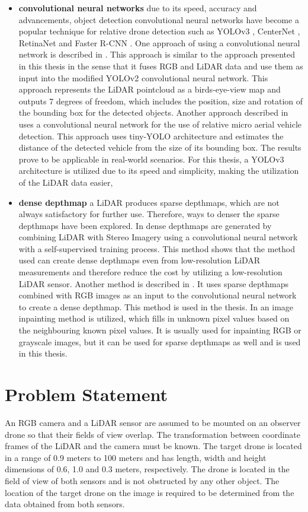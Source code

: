 \documentclass[twoside]{ctuthesis}
\theoremstyle{plain}
\theoremstyle{definition}
\theoremstyle{note}
\begin{document}
\begin{itemize}
	\item \textbf{convolutional neural networks} due to its speed, accuracy and advancements, object detection convolutional neural networks have become a popular technique for relative drone detection such as YOLOv3 \cite{redmon2018yolov3}, CenterNet \cite{zhou2019objects}, RetinaNet \cite{lin2018focal} and Faster R-CNN \cite{ren2016faster}. One approach of using a convolutional neural network is described in \cite{ali2018yolo3d}. This approach is similar to the approach presented in this thesis in the sense that it fuses RGB and LiDAR data and use them as input into the modified YOLOv2 \cite{redmon2016yolo9000} convolutional neural network. This approach represents the LiDAR pointcloud as a birds-eye-view map and outputs 7 degrees of freedom, which includes the position, size and rotation of the bounding box for the detected objects. Another approach described in \cite{8988144} uses a convolutional neural network for the use of relative micro aerial vehicle detection. This approach uses tiny-YOLO architecture \cite{redmon2016yolo9000} and estimates the distance of the detected vehicle from the size of its bounding box. The results prove to be applicable in real-world scenarios. For this thesis, a YOLOv3 architecture is utilized due to its speed and simplicity, making the utilization of the LiDAR data easier,
	\item \textbf{dense depthmap} a LiDAR produces sparse depthmaps, which are not always satisfactory for further use. Therefore, ways to denser the sparse depthmaps have been explored. In \cite{zhang2020listereo} dense depthmaps are generated by combining LiDAR with Stereo Imagery using a convolutional neural network with a self-supervised training process. This method shows that the method used can create dense depthmaps even from low-resolution LiDAR measurements and therefore reduce the cost by utilizing a low-resolution LiDAR sensor. Another method is described in \cite{ma2018sparsetodense}. It uses sparse depthmaps combined with RGB images as an input to the convolutional neural network to create a dense depthmap. This method is used in the thesis. In \cite{cite:5} an image inpainting method is utilized, which fills in unknown pixel values based on the neighbouring known pixel values. It is usually used for inpainting RGB or grayscale images, but it can be used for sparse depthmaps as well and is used in this thesis.
\end{itemize}
\section{Problem Statement}
An RGB camera and a LiDAR sensor are assumed to be mounted on an observer drone so that their fields of view overlap. The transformation between coordinate frames of the LiDAR and the camera must be known. The target drone is located in a range of 0.9 meters to 100 meters and has length, width and height dimensions of 0.6, 1.0 and 0.3 meters, respectively. The drone is located in the field of view of both sensors and is not obstructed by any other object. The location of the target drone on the image is required to be determined from the data obtained from both sensors.
\end{document}
